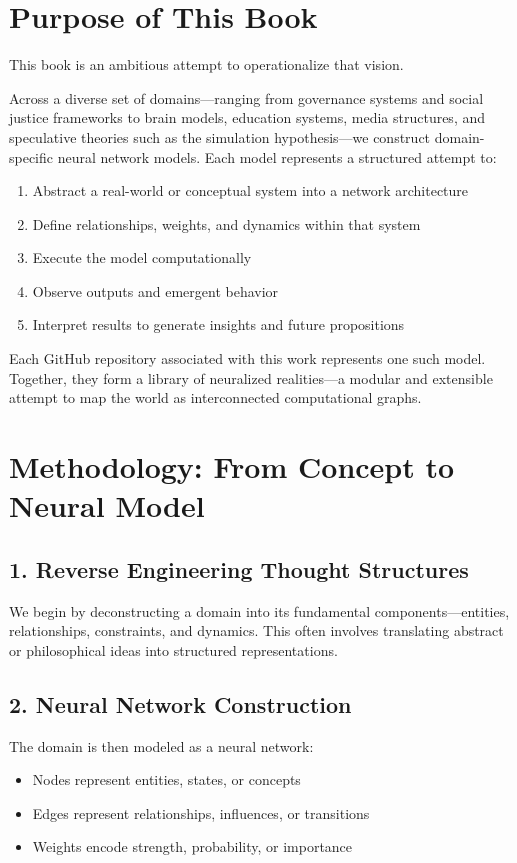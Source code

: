 \documentclass[12pt]{article}
\begin{document}
\section*{Purpose of This Book}

This book is an ambitious attempt to operationalize that vision.

Across a diverse set of domains—ranging from governance systems and social justice frameworks to brain models, education systems, media structures, and speculative theories such as the simulation hypothesis—we construct domain-specific neural network models. Each model represents a structured attempt to:

\begin{enumerate}
\item Abstract a real-world or conceptual system into a network architecture
\item Define relationships, weights, and dynamics within that system
\item Execute the model computationally
\item Observe outputs and emergent behavior
\item Interpret results to generate insights and future propositions
\end{enumerate}

Each GitHub repository associated with this work represents one such model. Together, they form a library of neuralized realities—a modular and extensible attempt to map the world as interconnected computational graphs.

\section*{Methodology: From Concept to Neural Model}

\subsection*{1. Reverse Engineering Thought Structures}
We begin by deconstructing a domain into its fundamental components—entities, relationships, constraints, and dynamics. This often involves translating abstract or philosophical ideas into structured representations.

\subsection*{2. Neural Network Construction}
The domain is then modeled as a neural network:
\begin{itemize}
\item Nodes represent entities, states, or concepts
\item Edges represent relationships, influences, or transitions
\item Weights encode strength, probability, or importance
\end{itemize}
\end{document}
